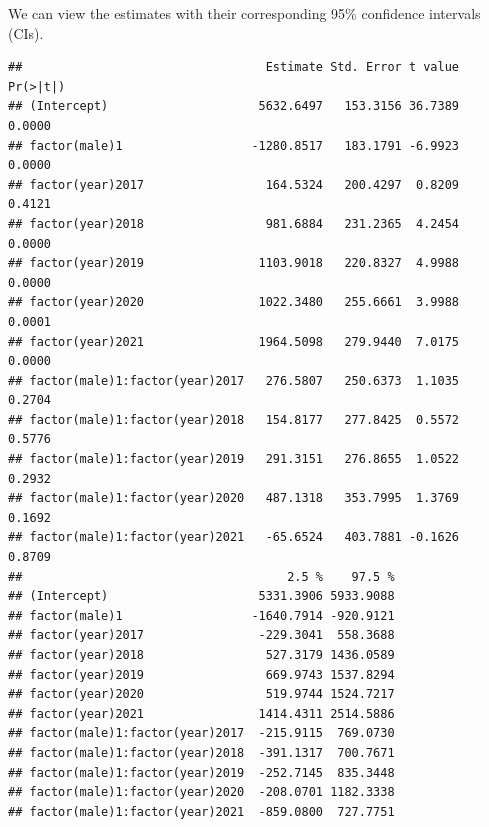 \documentclass[
]{book}
\newenvironment{Shaded}{\begin{snugshade}}{\end{snugshade}}
\newcommand{\AttributeTok}[1]{\textcolor[rgb]{0.77,0.63,0.00}{#1}}
\newcommand{\CommentTok}[1]{\textcolor[rgb]{0.56,0.35,0.01}{\textit{#1}}}
\newcommand{\DecValTok}[1]{\textcolor[rgb]{0.00,0.00,0.81}{#1}}
\newcommand{\FunctionTok}[1]{\textcolor[rgb]{0.00,0.00,0.00}{#1}}
\newcommand{\NormalTok}[1]{#1}
\newcommand{\SpecialCharTok}[1]{\textcolor[rgb]{0.00,0.00,0.00}{#1}}
\begin{document}
We can view the estimates with their corresponding 95\% confidence intervals (CIs).

\begin{Shaded}
\end{Shaded}

\begin{verbatim}
##                                  Estimate Std. Error t value Pr(>|t|)
## (Intercept)                     5632.6497   153.3156 36.7389   0.0000
## factor(male)1                  -1280.8517   183.1791 -6.9923   0.0000
## factor(year)2017                 164.5324   200.4297  0.8209   0.4121
## factor(year)2018                 981.6884   231.2365  4.2454   0.0000
## factor(year)2019                1103.9018   220.8327  4.9988   0.0000
## factor(year)2020                1022.3480   255.6661  3.9988   0.0001
## factor(year)2021                1964.5098   279.9440  7.0175   0.0000
## factor(male)1:factor(year)2017   276.5807   250.6373  1.1035   0.2704
## factor(male)1:factor(year)2018   154.8177   277.8425  0.5572   0.5776
## factor(male)1:factor(year)2019   291.3151   276.8655  1.0522   0.2932
## factor(male)1:factor(year)2020   487.1318   353.7995  1.3769   0.1692
## factor(male)1:factor(year)2021   -65.6524   403.7881 -0.1626   0.8709
##                                     2.5 %    97.5 %
## (Intercept)                     5331.3906 5933.9088
## factor(male)1                  -1640.7914 -920.9121
## factor(year)2017                -229.3041  558.3688
## factor(year)2018                 527.3179 1436.0589
## factor(year)2019                 669.9743 1537.8294
## factor(year)2020                 519.9744 1524.7217
## factor(year)2021                1414.4311 2514.5886
## factor(male)1:factor(year)2017  -215.9115  769.0730
## factor(male)1:factor(year)2018  -391.1317  700.7671
## factor(male)1:factor(year)2019  -252.7145  835.3448
## factor(male)1:factor(year)2020  -208.0701 1182.3338
## factor(male)1:factor(year)2021  -859.0800  727.7751
\end{verbatim}
\end{document}
